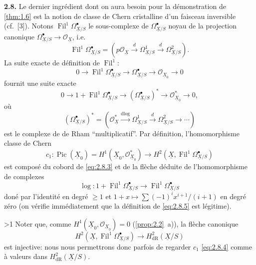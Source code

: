 \documentclass[10pt]{article}
\DeclareMathOperator{\Pic}{Pic}
\DeclareMathOperator{\Fil}{Fil}
\newcommand{\dlog}{\mathrm{dlog}}
\newcommand{\UX}{\underline{X}}
\newcommand{\DPage}[2]{\ifnum#1>1\clearpage\fi\setcounter{page}{#2}}
\begin{document}
\noindent\textbf{2.8.}
Le dernier ingrédient dont on aura besoin pour la démonstration de \ref{thm:1.6} est la notion de classe de Chern cristalline d'un faisceau inversible (cf.~[3]). Notons $\Fil^1 \Omega^{\bullet}_{\UX/S}$ le sous-complexe de $\Omega^{\bullet}_{\UX/S}$ noyau de la projection canonique $\Omega^{\bullet}_{\UX/S} \to \mathcal{O}_{\UX}$, i.e.
\begin{equation}\tag{2.8.1}\label{eq:2.8.1}
\Fil^1 \Omega^{\bullet}_{\UX/S} = (p\mathcal O_{\UX}\xrightarrow{d}\Omega^1_{\UX/S}\xrightarrow{d}\Omega^2_{\UX/S}).
\end{equation}
La suite exacte de définition de $\Fil^1$:
\begin{equation}\tag{2.8.2}\label{eq:2.8.2}
0 \to \Fil^1 \Omega^{\bullet}_{\UX/S} \to \Omega^{\bullet}_{\UX/S} \to \mathcal{O}_{\UX_0} \to 0
\end{equation}
fournit une suite exacte
\begin{equation}\tag{2.8.3}\label{eq:2.8.3}
0 \to 1 + \Fil^1 \Omega^{\bullet}_{\UX/S} \to (\Omega^{\bullet}_{\UX/S})^* \to \mathcal{O}_{\UX_0}^* \to 0,
\end{equation}
où
\[
(\Omega^{\bullet}_{\UX/S})^* = (\mathcal{O}_{\UX}^* \xrightarrow{\dlog} \Omega^1_{\UX/S} \xrightarrow{d} \Omega^2_{\UX/S} \to \cdots)
\]
est le complexe de de Rham ``multiplicatif''. Par définition, l'homomorphisme classe de Chern
\begin{equation}\tag{2.8.4}\label{eq:2.8.4}
c_1: \Pic(\UX_0) = H^1(\UX_0, \mathcal{O}_{\UX_0}^*) \to H^2(\UX, \Fil^1 \Omega^{\bullet}_{\UX/S})
\end{equation}
est composé du cobord de \eqref{eq:2.8.3} et de la flèche déduite de l'homomorphisme de complexes
\begin{equation}\tag{2.8.5}\label{eq:2.8.5}
\log: 1 + \Fil^1 \Omega^{\bullet}_{\UX/S} \to \Fil^1 \Omega^{\bullet}_{\UX/S}
\end{equation}
doné par l'identité en degré $\geqslant 1$ et $1+x \mapsto \sum (-1)^i x^{i+1}/(i+1)$ en degré zéro (on vérifie immédiatement que la définition de \eqref{eq:2.8.5} est légitime).

\DPage{16}{73}
Noter que, comme $H^1(\UX_0, \mathcal{O}_{\UX_0}) = 0$ (\ref{prop:2.2}~a)), la flèche canonique
\begin{equation}\tag{2.8.6}\label{eq:2.8.6}
H^2(\UX, \Fil^1 \Omega^{\bullet}_{\UX/S}) \to H^2_{\mathrm{dR}}(\UX/S)
\end{equation}
est injective: nous nous permettrons donc parfois de regarder $c_1$ \eqref{eq:2.8.4} comme à valeurs dans $H^2_{\mathrm{dR}}(\UX/S)$.
\end{document}
